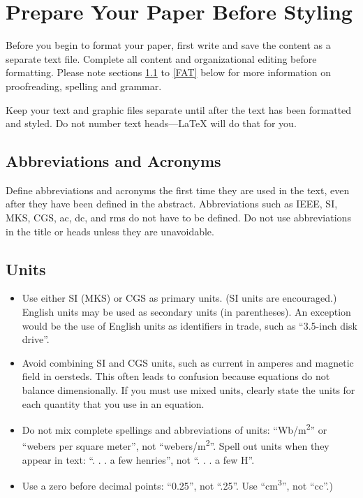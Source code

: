 \documentclass[conference]{IEEEtran}
\begin{document}
\section{Prepare Your Paper Before Styling}
Before you begin to format your paper, first write and save the content as a 
separate text file. Complete all content and organizational editing before 
formatting. Please note sections \ref{AA} to \ref{FAT} below for more information on 
proofreading, spelling and grammar.

Keep your text and graphic files separate until after the text has been 
formatted and styled. Do not number text heads---{\LaTeX} will do that 
for you.

\subsection{Abbreviations and Acronyms}\label{AA}
Define abbreviations and acronyms the first time they are used in the text, 
even after they have been defined in the abstract. Abbreviations such as 
IEEE, SI, MKS, CGS, ac, dc, and rms do not have to be defined. Do not use 
abbreviations in the title or heads unless they are unavoidable.

\subsection{Units}
\begin{itemize}
\item Use either SI (MKS) or CGS as primary units. (SI units are encouraged.) English units may be used as secondary units (in parentheses). An exception would be the use of English units as identifiers in trade, such as ``3.5-inch disk drive''.
\item Avoid combining SI and CGS units, such as current in amperes and magnetic field in oersteds. This often leads to confusion because equations do not balance dimensionally. If you must use mixed units, clearly state the units for each quantity that you use in an equation.
\item Do not mix complete spellings and abbreviations of units: ``Wb/m\textsuperscript{2}'' or ``webers per square meter'', not ``webers/m\textsuperscript{2}''. Spell out units when they appear in text: ``. . . a few henries'', not ``. . . a few H''.
\item Use a zero before decimal points: ``0.25'', not ``.25''. Use ``cm\textsuperscript{3}'', not ``cc''.)
\end{itemize}
\end{document}
